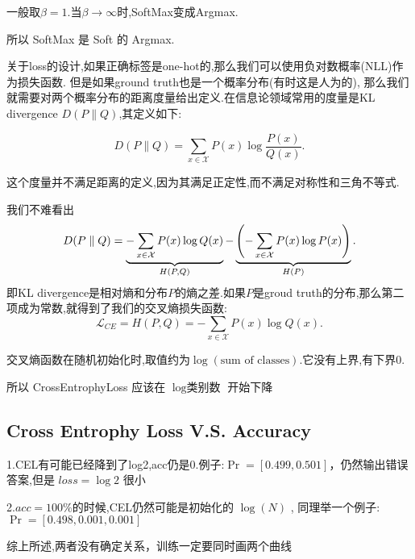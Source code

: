 一般取$\beta = 1.$当$\beta \to \infty$时,SoftMax变成Argmax.

所以 SoftMax 是 Soft 的 Argmax.

关于loss的设计,如果正确标签是one-hot的,那么我们可以使用负对数概率(NLL)作为损失函数.
但是如果ground truth也是一个概率分布(有时这是人为的),
那么我们就需要对两个概率分布的距离度量给出定义.在信息论领域常用的度量是KL divergence $D(P \parallel Q)$,其定义如下:

\begin{equation}
	D(P \parallel Q) = \sum_{x \in \mathcal X} P(x) \log \frac{P(x)}{Q(x)}.
\end{equation}

这个度量并不满足距离的定义,因为其满足正定性,而不满足对称性和三角不等式.

我们不难看出
\begin{equation}
	D(P \parallel Q) = \underbrace{-\sum_{x \in \mathcal X} P(x)\log Q(x)}_{H(P, Q)} - \underbrace{\left( -\sum_{x \in \mathcal X} P(x) \log P(x)\right)}_{H(P)}.
\end{equation}
即KL divergence是相对熵和分布$P$的熵之差.如果$P$是groud truth的分布,那么第二项成为常数,就得到了我们的交叉熵损失函数:
\begin{equation}
	\mathcal L_{CE} = H(P, Q) = -\sum_{x \in \mathcal X} P(x) \log Q(x).
\end{equation}

交叉熵函数在随机初始化时,取值约为$\log (\text{sum of classes})$.它没有上界,有下界$0$.

所以 CrossEntrophyLoss 应该在 $\log{\text{类别数}}$ 开始下降

\subsection{Cross Entrophy Loss V.S. Accuracy}

1.CEL有可能已经降到了log2,acc仍是0.例子:$\Pr=[0.499,0.501]$，仍然输出错误答案,但是 $loss=\log2$ 很小

2.$acc=100\%$的时候,CEL仍然可能是初始化的 $\log(N)$ , 同理举一个例子:$\Pr=[0.498,0.001,0.001]$

综上所述,两者没有确定关系，训练一定要同时画两个曲线